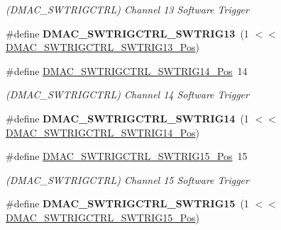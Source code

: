 \begin{DoxyCompactItemize}
\begin{DoxyCompactList}\small\item\em (D\+M\+A\+C\+\_\+\+S\+W\+T\+R\+I\+G\+C\+T\+R\+L) Channel 13 Software Trigger \end{DoxyCompactList}\item 
\hypertarget{group___s_a_m_l21___d_m_a_c_ga3e450dab80478906c281d35879b39823}{}\#define {\bfseries D\+M\+A\+C\+\_\+\+S\+W\+T\+R\+I\+G\+C\+T\+R\+L\+\_\+\+S\+W\+T\+R\+I\+G13}~(1 $<$$<$ \hyperlink{group___s_a_m_l21___d_m_a_c_ga4c1e5438c576a7e565eb87993d0d19a6}{D\+M\+A\+C\+\_\+\+S\+W\+T\+R\+I\+G\+C\+T\+R\+L\+\_\+\+S\+W\+T\+R\+I\+G13\+\_\+\+Pos})\label{group___s_a_m_l21___d_m_a_c_ga3e450dab80478906c281d35879b39823}

\item 
\hypertarget{group___s_a_m_l21___d_m_a_c_ga59d5b8236c0a1c1b9b250894b2cf9b78}{}\#define \hyperlink{group___s_a_m_l21___d_m_a_c_ga59d5b8236c0a1c1b9b250894b2cf9b78}{D\+M\+A\+C\+\_\+\+S\+W\+T\+R\+I\+G\+C\+T\+R\+L\+\_\+\+S\+W\+T\+R\+I\+G14\+\_\+\+Pos}~14\label{group___s_a_m_l21___d_m_a_c_ga59d5b8236c0a1c1b9b250894b2cf9b78}

\begin{DoxyCompactList}\small\item\em (D\+M\+A\+C\+\_\+\+S\+W\+T\+R\+I\+G\+C\+T\+R\+L) Channel 14 Software Trigger \end{DoxyCompactList}\item 
\hypertarget{group___s_a_m_l21___d_m_a_c_ga3cef5178c956c0b3b7119a139913f22f}{}\#define {\bfseries D\+M\+A\+C\+\_\+\+S\+W\+T\+R\+I\+G\+C\+T\+R\+L\+\_\+\+S\+W\+T\+R\+I\+G14}~(1 $<$$<$ \hyperlink{group___s_a_m_l21___d_m_a_c_ga59d5b8236c0a1c1b9b250894b2cf9b78}{D\+M\+A\+C\+\_\+\+S\+W\+T\+R\+I\+G\+C\+T\+R\+L\+\_\+\+S\+W\+T\+R\+I\+G14\+\_\+\+Pos})\label{group___s_a_m_l21___d_m_a_c_ga3cef5178c956c0b3b7119a139913f22f}

\item 
\hypertarget{group___s_a_m_l21___d_m_a_c_gad94f4ad8f6a0cbf6db90d9594926dab8}{}\#define \hyperlink{group___s_a_m_l21___d_m_a_c_gad94f4ad8f6a0cbf6db90d9594926dab8}{D\+M\+A\+C\+\_\+\+S\+W\+T\+R\+I\+G\+C\+T\+R\+L\+\_\+\+S\+W\+T\+R\+I\+G15\+\_\+\+Pos}~15\label{group___s_a_m_l21___d_m_a_c_gad94f4ad8f6a0cbf6db90d9594926dab8}

\begin{DoxyCompactList}\small\item\em (D\+M\+A\+C\+\_\+\+S\+W\+T\+R\+I\+G\+C\+T\+R\+L) Channel 15 Software Trigger \end{DoxyCompactList}\item 
\hypertarget{group___s_a_m_l21___d_m_a_c_gac534bd73d366e36804664fd3c7bc330e}{}\#define {\bfseries D\+M\+A\+C\+\_\+\+S\+W\+T\+R\+I\+G\+C\+T\+R\+L\+\_\+\+S\+W\+T\+R\+I\+G15}~(1 $<$$<$ \hyperlink{group___s_a_m_l21___d_m_a_c_gad94f4ad8f6a0cbf6db90d9594926dab8}{D\+M\+A\+C\+\_\+\+S\+W\+T\+R\+I\+G\+C\+T\+R\+L\+\_\+\+S\+W\+T\+R\+I\+G15\+\_\+\+Pos})\label{group___s_a_m_l21___d_m_a_c_gac534bd73d366e36804664fd3c7bc330e}


\end{DoxyCompactItemize}
